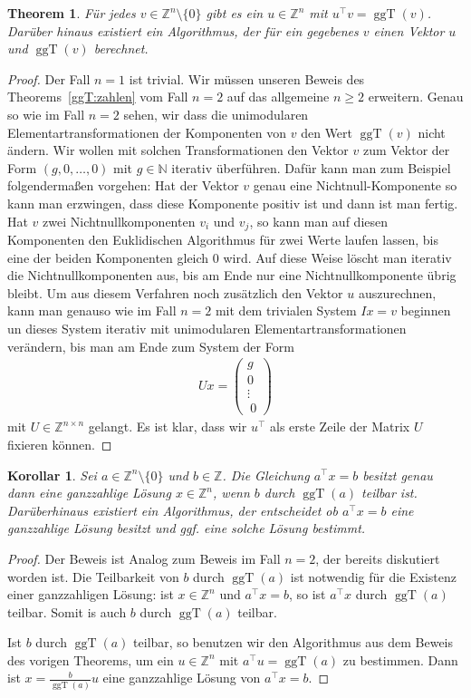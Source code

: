 \documentclass[
a4paper,12pt,
bibliography=totocnumbered,
numbers=noenddot,
]{scrartcl}
\numberwithin{equation}{subsection}
\newcommand{\N}{\mathbb N}
\newcommand{\Z}{\mathbb Z}
\newcommand{\ggT}{\operatorname{ggT}} %
\theoremstyle{plain}
\newtheorem*{thm}{Theorem}
\newtheorem*{klr}{Korollar}
\theoremstyle{definition}
\begin{document}
\begin{thm} 
	Für jedes $v \in \Z^n \setminus \{0\}$ gibt es ein $u \in \Z^n$ mit $u^\top v = \ggT(v)$. Darüber hinaus existiert ein Algorithmus, der für ein gegebenes $v$ einen Vektor $u$ und $\ggT(v)$ berechnet. 
\end{thm} 
\begin{proof} 
	Der Fall $n =1$ ist trivial. 
	Wir müssen unseren Beweis des Theorems~\ref{ggT:zahlen} vom Fall $n=2$ auf das allgemeine $n \ge 2$ erweitern. Genau so wie im Fall $n=2$ sehen, wir dass die unimodularen Elementartransformationen der Komponenten von $v$ den Wert $\ggT(v)$ nicht ändern. Wir wollen mit solchen Transformationen den Vektor $v$ zum Vektor der Form $(g,0,\ldots, 0)$ mit $g \in \N$ iterativ überführen. Dafür kann man zum Beispiel folgendermaßen vorgehen: Hat der Vektor $v$ genau eine Nichtnull-Komponente so kann man erzwingen, dass diese Komponente positiv ist und dann ist man fertig. Hat $v$ zwei Nichtnullkomponenten $v_i$ und $v_j$, so kann man auf diesen Komponenten den Euklidischen Algorithmus für zwei Werte laufen lassen, bis eine der beiden Komponenten gleich $0$ wird. Auf diese Weise löscht man iterativ die Nichtnullkomponenten aus, bis am Ende nur eine Nichtnullkomponente übrig bleibt. Um aus diesem Verfahren noch zusätzlich den Vektor $u$ auszurechnen, kann man genauso wie im Fall $n=2$ mit dem trivialen System $I x = v$ beginnen un dieses System iterativ mit unimodularen Elementartransformationen verändern, bis man am Ende zum System der Form 
	\begin{align*}
			U x = \begin{pmatrix} g \\ 0 \\ \vdots \\\ 0 \end{pmatrix} 
	\end{align*} 
	mit $U \in \Z^{n \times n}$ gelangt. Es ist klar, dass wir $u^\top$ als erste Zeile der Matrix $U$ fixieren können. 
\end{proof} 


\begin{klr}
	Sei $a \in \Z^n \setminus \{0\}$ und $b \in \Z$. Die Gleichung $a^\top x = b$ besitzt genau dann eine ganzzahlige Lösung $x \in \Z^n$, wenn $b$ durch $\ggT(a)$ teilbar ist. Darüberhinaus existiert ein Algorithmus, der entscheidet ob $a^\top x = b$ eine ganzzahlige Lösung besitzt und ggf. eine solche Lösung bestimmt. 
\end{klr} 
\begin{proof} 
	Der Beweis ist Analog zum Beweis im Fall $n=2$, der bereits diskutiert worden ist. Die Teilbarkeit von $b$ durch $\ggT(a)$ ist notwendig für die Existenz einer ganzzahligen Lösung: ist $x \in \Z^n$ und $a^\top  x = b$, so ist $a^\top x$ durch $\ggT(a)$ teilbar. Somit is auch $b$ durch $\ggT(a)$ teilbar. 
	
	Ist $b$ durch $\ggT(a)$ teilbar, so benutzen wir den Algorithmus aus dem Beweis des vorigen Theorems, um ein $u \in \Z^n$ mit $a^\top u = \ggT(a)$ zu bestimmen. Dann ist $x = \frac{b}{\ggT(a)} u $ eine ganzzahlige Lösung von $a^\top x = b$. 
\end{proof} 
\end{document}
